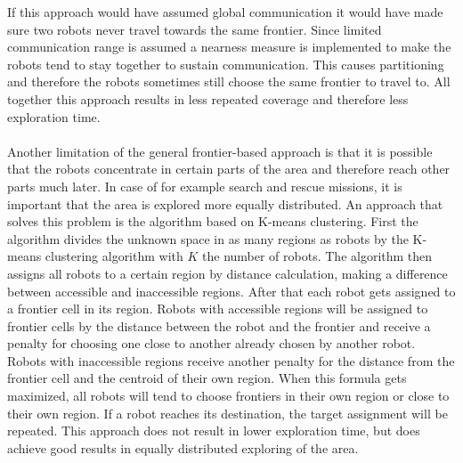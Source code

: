   If this approach would have assumed global communication it would have made sure two robots never travel towards the same frontier.
  Since limited communication range is assumed a nearness measure is implemented to make the robots tend to stay together to sustain communication.
  This causes partitioning and therefore the robots sometimes still choose the same frontier to travel to.
  All together this approach results in less repeated coverage and therefore less exploration time. \cite{sheng2006distributed}\\
  \\
  Another limitation of the general frontier-based approach is that it is possible that the robots concentrate in certain parts of the area and therefore reach other parts much later.
  In case of for example search and rescue missions, it is important that the area is explored more equally distributed. 
  An approach that solves this problem is the algorithm based on K-means clustering.
  First the algorithm divides the unknown space in as many regions as robots by the K-means clustering algorithm with $K$ the number of robots.
  The algorithm then assigns all robots to a certain region by distance calculation, making a difference between accessible and inaccessible regions.
  After that each robot gets assigned to a frontier cell in its region.
  Robots with accessible regions will be assigned to frontier cells by the distance between the robot and the frontier and receive a penalty for choosing one close to another already chosen by another robot.
  Robots with inaccessible regions receive another penalty for the distance from the frontier cell and the centroid of their own region.
  When this formula gets maximized, all robots will tend to choose frontiers in their own region or close to their own region.
  If a robot reaches its destination, the target assignment will be repeated.
  This approach does not result in lower exploration time, but does achieve good results in equally distributed exploring of the area. \cite{solanas2004coordinated}

